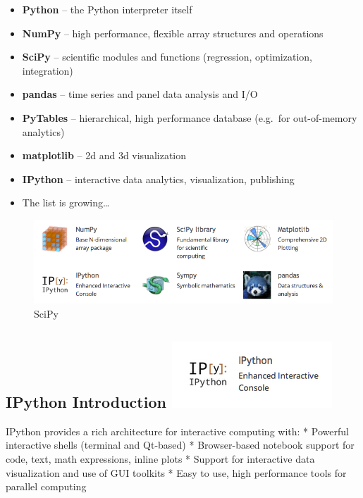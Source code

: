 \documentclass{article}
\begin{document}
\begin{itemize}
\item
  \textbf{Python} -- the Python interpreter itself
\item
  \textbf{NumPy} -- high performance, flexible array structures and
  operations
\item
  \textbf{SciPy} -- scientific modules and functions (regression,
  optimization, integration)
\item
  \textbf{pandas} -- time series and panel data analysis and I/O
\item
  \textbf{PyTables} -- hierarchical, high performance database (e.g.~for
  out-of-memory analytics)
\item
  \textbf{matplotlib} -- 2d and 3d visualization
\item
  \textbf{IPython} -- interactive data analytics, visualization,
  publishing
\item
  The list is growing\ldots{}
\end{itemize}

\begin{figure}[htbp]
\centering
\includegraphics{static/img/scistack.png}
\caption{SciPy}
\end{figure}

    \subsection{IPython Introduction \includegraphics{static/img/ipy.png}}

IPython provides a rich architecture for interactive computing with: *
Powerful interactive shells (terminal and Qt-based) * Browser-based
notebook support for code, text, math expressions, inline plots *
Support for interactive data visualization and use of GUI toolkits *
Easy to use, high performance tools for parallel computing
\end{document}
